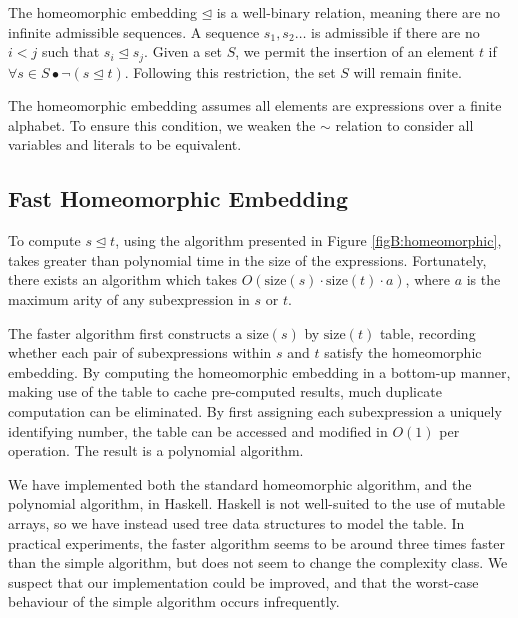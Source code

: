 The homeomorphic embedding $\unlhd$ is a well-binary relation, meaning there are no infinite admissible sequences. A sequence $s_1,s_2 \ldots$ is admissible if there are no $i < j$ such that $s_i \unlhd s_j$. Given a set $S$, we permit the insertion of an element $t$ if $\forall s \in S \bullet \neg(s \unlhd t)$. Following this restriction, the set $S$ will remain finite.

The homeomorphic embedding assumes all elements are expressions over a finite alphabet. To ensure this condition, we weaken the $\sim$ relation to consider all variables and literals to be equivalent.

\subsection{Fast Homeomorphic Embedding}

To compute $s \unlhd t$, using the algorithm presented in Figure \ref{figB:homeomorphic}, takes greater than polynomial time in the size of the expressions. Fortunately, there exists an algorithm \cite{stillman:computational_problems,stillman:homeomorphic} which takes $O(\text{size}(s) \cdot \text{size}(t) \cdot a)$, where $a$ is the maximum arity of any subexpression in $s$ or $t$.

The faster algorithm first constructs a $\text{size}(s)$ by $\text{size}(t)$ table, recording whether each pair of subexpressions within $s$ and $t$ satisfy the homeomorphic embedding. By computing the homeomorphic embedding in a bottom-up manner, making use of the table to cache pre-computed results, much duplicate computation can be eliminated. By first assigning each subexpression a uniquely identifying number, the table can be accessed and modified in $O(1)$ per operation. The result is a polynomial algorithm.

We have implemented both the standard homeomorphic algorithm, and the polynomial algorithm, in Haskell. Haskell is not well-suited to the use of mutable arrays, so we have instead used tree data structures to model the table. In practical experiments, the faster algorithm seems to be around three times faster than the simple algorithm, but does not seem to change the complexity class. We suspect that our implementation could be improved, and that the worst-case behaviour of the simple algorithm occurs infrequently.
